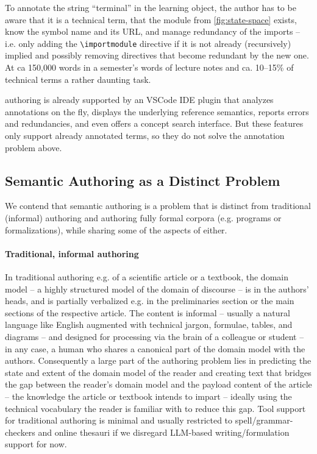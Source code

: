 \documentclass{llncs}
\begin{document}
To annotate the string ``terminal'' in the learning object, the author has to be aware
that it is a technical term, that the module from \cref{fig:state-space} exists, know the
symbol name and its URL, and manage redundancy of the imports -- i.e. only
adding the \lstinline|\importmodule| directive if it is not already (recursively) implied
and possibly removing directives that become redundant by the new one.  At ca 150,000
words in a semester's words of lecture notes and ca. 10--15\% of technical terms a rather daunting task.

\sTeX authoring is already supported by an VSCode IDE plugin \cite{sTeX-IDE:git} that
analyzes annotations on the fly, displays the underlying reference semantics, reports
errors and redundancies, and even offers a concept search interface.
But these features only support already annotated terms, so they do not solve the annotation problem above.

\subsection{Semantic Authoring as a Distinct Problem}

We contend that semantic authoring is a problem that is distinct from traditional
(informal) authoring and authoring fully formal corpora (e.g. programs or formalizations),
while sharing some of the aspects of either.

\paragraph{Traditional, informal authoring}
In traditional authoring e.g. of a scientific article or a textbook, the domain model -- a
highly structured model of the domain of discourse -- is in the authors' heads, and is
partially verbalized e.g. in the preliminaries section or the main sections of the
respective article. The content is informal -- usually a natural language like English
augmented with technical jargon, formulae, tables, and diagrams -- and designed for
processing via the brain of a colleague or student -- in any case, a human who shares a
canonical part of the domain model with the authors. Consequently a large part of the authoring problem lies in
predicting the state and extent of the domain model of the reader and creating text that
bridges the gap between the reader's domain model and the payload content of the article
-- the knowledge the article or textbook intends to impart -- ideally using the technical
vocabulary the reader is familiar with to reduce this gap. Tool support for traditional
authoring is minimal and usually restricted to spell/grammar-checkers and online thesauri
if we disregard LLM-based writing/formulation support for now.
\end{document}
